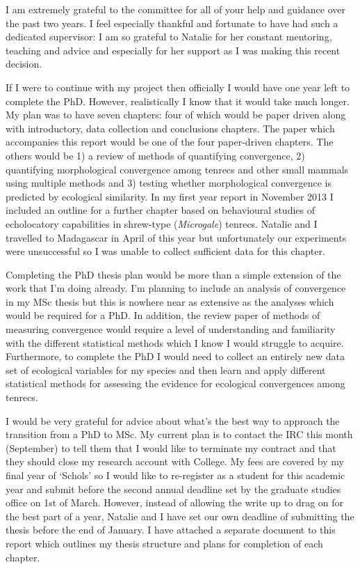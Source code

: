 \documentclass[12pt,a4paper]{article}
\begin{document}
	I am extremely grateful to the committee for all of your help and guidance over the past two years. I feel especially thankful and fortunate to have had such a dedicated supervisor: I am so grateful to Natalie for her constant mentoring, teaching and advice and especially for her support as I was making this recent decision.  %
	
	If I were to continue with my project then officially I would have one year left to complete the PhD. However, realistically I know that it would take much longer. My plan was to have seven chapters: four of which would be paper driven along with introductory, data collection and conclusions chapters. The paper which accompanies this report would be one of the four paper-driven chapters. The others would be 1) a review of methods of quantifying convergence, 
	2) quantifying morphological convergence among tenrecs and other small mammals using multiple methods and 3) testing whether morphological convergence is predicted by ecological similarity.
    In my first year report in November 2013 I included an outline for a further chapter based on behavioural studies of echolocatory capabilities in shrew-type (\textit{Microgale}) tenrecs. Natalie and I travelled to Madagascar in April of this year but unfortunately our experiments were unsuccessful so I was unable to collect sufficient data for this chapter.
	
	Completing the PhD thesis plan would be more than a simple extension of the work that I'm doing already. I'm planning to include an analysis of convergence in my MSc thesis but this is nowhere near as extensive as the analyses which would be required for a PhD. In addition, the review paper of methods of measuring convergence would require a level of understanding and familiarity with the different statistical methods which I know I would struggle to acquire. Furthermore, to complete the PhD I would need to collect an entirely new data set of ecological variables for my species and then learn and apply different statistical methods for assessing the evidence for ecological convergences among tenrecs.

	I would be very grateful for advice about what's the best way to approach the transition from a PhD to MSc. My current plan is to contact the IRC this month (September) to tell them that I would like to terminate my contract and that they should close my research account with College. My fees are covered by my final year of `Schols' so I would like to re-register as a student for this academic year and submit before the second annual deadline set by the graduate studies office on 1st of March. However, instead of allowing the write up to drag on for the best part of a year, Natalie and I have set our own deadline of submitting the thesis before the end of January. I have attached a separate document to this report which outlines my thesis structure and plans for completion of each chapter.
 
\end{document}
